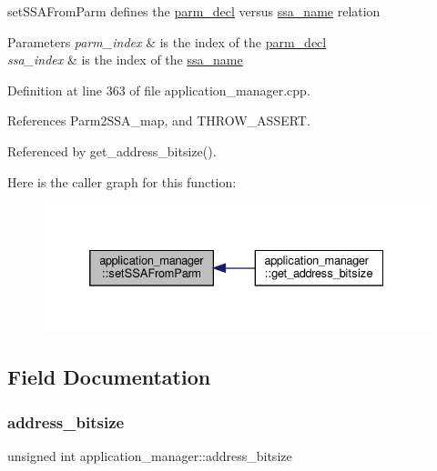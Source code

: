 set\+S\+S\+A\+From\+Parm defines the \hyperlink{structparm__decl}{parm\+\_\+decl} versus \hyperlink{structssa__name}{ssa\+\_\+name} relation 


\begin{DoxyParams}{Parameters}
{\em parm\+\_\+index} & is the index of the \hyperlink{structparm__decl}{parm\+\_\+decl} \\
\hline
{\em ssa\+\_\+index} & is the index of the \hyperlink{structssa__name}{ssa\+\_\+name} \\
\hline
\end{DoxyParams}


Definition at line 363 of file application\+\_\+manager.\+cpp.



References Parm2\+S\+S\+A\+\_\+map, and T\+H\+R\+O\+W\+\_\+\+A\+S\+S\+E\+RT.



Referenced by get\+\_\+address\+\_\+bitsize().

Here is the caller graph for this function\+:
\nopagebreak
\begin{figure}[H]
\begin{center}
\leavevmode
\includegraphics[width=332pt]{dc/db5/classapplication__manager_a7b00a19f52bd23b5d4e35b93b46a3637_icgraph}
\end{center}
\end{figure}


\subsection{Field Documentation}
\mbox{\label{classapplication__manager_abff6b028fd71e5805c69f6d24ea1d0d2}} 
\subsubsection{\texorpdfstring{address\+\_\+bitsize}{address\_bitsize}}
{\footnotesize\ttfamily unsigned int application\+\_\+manager\+::address\+\_\+bitsize\hspace{0.3cm}{\ttfamily [protected]}}



